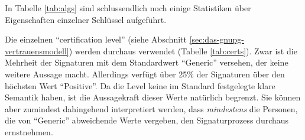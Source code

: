 \begin{table}[ht!]
  \footnotesize
  \centering
  \quad
  \quad
  \caption{Verwendung von Hashalgorithmen 
    , Public-Key-Algorithmen  und
    Cert-Leveln  in der gr\"ossten starken
    Zusammenhangskomponente}
\end{table}

In Tabelle \ref{tab:algs} sind schlussendlich noch einige Statistiken
\"uber Eigenschaften einzelner Schl\"ussel aufgef\"uhrt. 

Die einzelnen ``certification level'' (siehe Abschnitt
\ref{sec:das-gnupg-vertrauensmodell}) werden durchaus verwendet
(Tabelle \ref{tab:certs}). Zwar ist die Mehrheit der Signaturen mit
dem Standardwert ``Generic'' versehen, der keine weitere Aussage
macht. Allerdings verf\"ugt \"uber 25\% der Signaturen \"uber den
h\"ochsten Wert ``Positive''. Da die Level keine im Standard
festgelegte klare Semantik haben, ist die Aussagekraft dieser Werte
nat\"urlich begrenzt. Sie k\"onnen aber zumindest dahingehend
interpretiert werden, dass \emph{mindestens} die Personen, die von
``Generic'' abweichende Werte vergeben, den Signaturprozess durchaus
ernstnehmen.

